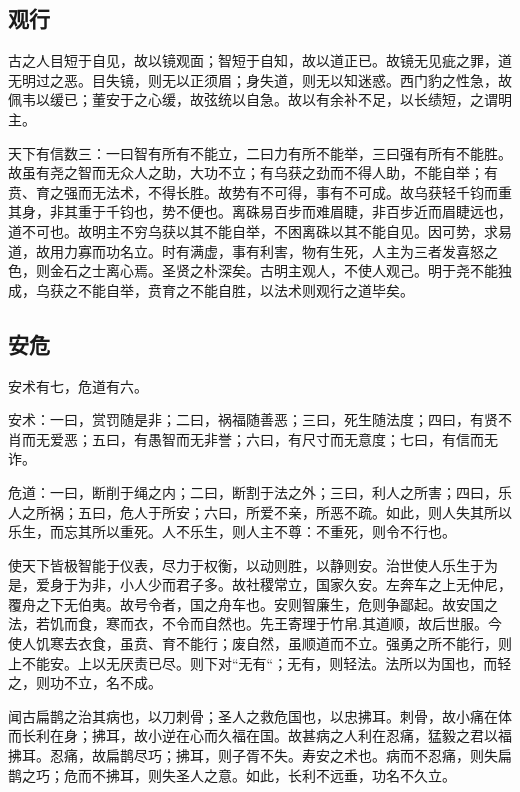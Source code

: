 \documentclass[]{article}
\begin{document}
\hypertarget{header-n1065}{%
\subsection{观行}\label{header-n1065}}

古之人目短于自见，故以镜观面；智短于自知，故以道正已。故镜无见疵之罪，道无明过之恶。目失镜，则无以正须眉；身失道，则无以知迷惑。西门豹之性急，故佩韦以缓已；董安于之心缓，故弦统以自急。故以有余补不足，以长绩短，之谓明主。

天下有信数三：一曰智有所有不能立，二曰力有所不能举，三曰强有所有不能胜。故虽有尧之智而无众人之助，大功不立；有乌获之劲而不得人助，不能自举；有贲、育之强而无法术，不得长胜。故势有不可得，事有不可成。故乌获轻千钧而重其身，非其重于千钧也，势不便也。离硃易百步而难眉睫，非百步近而眉睫远也，道不可也。故明主不穷乌获以其不能自举，不困离硃以其不能自见。因可势，求易道，故用力寡而功名立。时有满虚，事有利害，物有生死，人主为三者发喜怒之色，则金石之士离心焉。圣贤之朴深矣。古明主观人，不使人观己。明于尧不能独成，乌获之不能自举，贲育之不能自胜，以法术则观行之道毕矣。

\hypertarget{header-n1068}{%
\subsection{安危}\label{header-n1068}}

安术有七，危道有六。

安术：一曰，赏罚随是非；二曰，祸福随善恶；三曰，死生随法度；四曰，有贤不肖而无爱恶；五曰，有愚智而无非誉；六曰，有尺寸而无意度；七曰，有信而无诈。

危道：一曰，断削于绳之内；二曰，断割于法之外；三曰，利人之所害；四曰，乐人之所祸；五曰，危人于所安；六曰，所爱不亲，所恶不疏。如此，则人失其所以乐生，而忘其所以重死。人不乐生，则人主不尊：不重死，则令不行也。

使天下皆极智能于仪表，尽力于权衡，以动则胜，以静则安。治世使人乐生于为是，爱身于为非，小人少而君子多。故社稷常立，国家久安。左奔车之上无仲尼，覆舟之下无伯夷。故号令者，国之舟车也。安则智廉生，危则争鄙起。故安国之法，若饥而食，寒而衣，不令而自然也。先王寄理于竹帛.其道顺，故后世服。今使人饥寒去衣食，虽贲、育不能行；废自然，虽顺道而不立。强勇之所不能行，则上不能安。上以无厌责已尽。则下对``无有``；无有，则轻法。法所以为国也，而轻之，则功不立，名不成。

闻古扁鹊之治其病也，以刀刺骨；圣人之救危国也，以忠拂耳。刺骨，故小痛在体而长利在身；拂耳，故小逆在心而久福在国。故甚病之人利在忍痛，猛毅之君以福拂耳。忍痛，故扁鹊尽巧；拂耳，则子胥不失。寿安之术也。病而不忍痛，则失扁鹊之巧；危而不拂耳，则失圣人之意。如此，长利不远垂，功名不久立。
\end{document}
